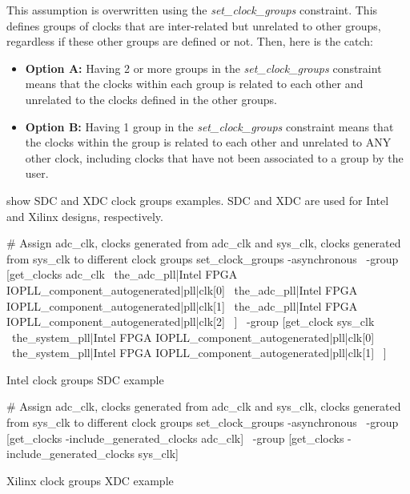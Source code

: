 This assumption is overwritten using the \textit{set\_clock\_groups} constraint. This defines groups of clocks that are inter-related but unrelated to other groups, regardless if these other groups are defined or not. 
 Then, here is the catch:
 
 \begin{itemize}
     \item \textbf{Option A:} Having 2 or more groups in the \textit{set\_clock\_groups} constraint means that the clocks within each group is related to each other and unrelated to the clocks defined in the other groups. 
     \item \textbf{Option B:} Having 1 group in the \textit{set\_clock\_groups} constraint means that the clocks within the group is related to each other and unrelated to ANY other clock, including clocks that have not been associated to a group by the user.
 \end{itemize}
 
  show SDC and XDC clock groups examples. SDC and XDC are used for Intel and Xilinx designs, respectively. 
 
 \begin{listing}[ht]
\begin{tclcode*}{}
# Assign adc_clk, clocks generated from adc_clk and sys_clk, clocks generated from sys_clk to different clock groups
set_clock_groups -asynchronous \
-group [get_clocks {adc_clk \
the_adc_pll|Intel FPGA IOPLL_component_autogenerated|pll|clk[0] \
the_adc_pll|Intel FPGA IOPLL_component_autogenerated|pll|clk[1] \
the_adc_pll|Intel FPGA IOPLL_component_autogenerated|pll|clk[2] \
}] \
-group [get_clock {sys_clk \
the_system_pll|Intel FPGA IOPLL_component_autogenerated|pll|clk[0] \
the_system_pll|Intel FPGA IOPLL_component_autogenerated|pll|clk[1] \
}]
\end{tclcode*}
\caption{Intel clock groups SDC example}
\label{listing:clockgroupssdc}
\end{listing}

 \begin{listing}[ht]
\begin{tclcode*}{}
# Assign adc_clk, clocks generated from adc_clk and sys_clk, clocks generated from sys_clk to different clock groups
set_clock_groups -asynchronous \
-group [get_clocks -include_generated_clocks adc_clk] \
-group [get_clocks -include_generated_clocks sys_clk]
\end{tclcode*}
\caption{Xilinx clock groups XDC example}
\label{listing:clockgroupssxdc}
\end{listing}

